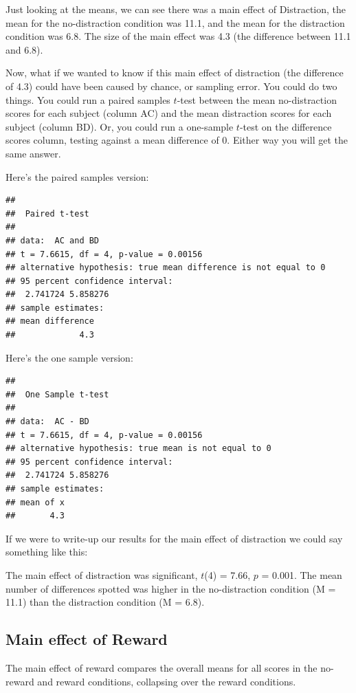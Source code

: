 \documentclass[
]{book}
\begin{document}
Just looking at the means, we can see there was a main effect of Distraction, the mean for the no-distraction condition was 11.1, and the mean for the distraction condition was 6.8. The size of the main effect was 4.3 (the difference between 11.1 and 6.8).

Now, what if we wanted to know if this main effect of distraction (the difference of 4.3) could have been caused by chance, or sampling error. You could do two things. You could run a paired samples \(t\)-test between the mean no-distraction scores for each subject (column AC) and the mean distraction scores for each subject (column BD). Or, you could run a one-sample \(t\)-test on the difference scores column, testing against a mean difference of 0. Either way you will get the same answer.

Here's the paired samples version:

\begin{verbatim}
## 
##  Paired t-test
## 
## data:  AC and BD
## t = 7.6615, df = 4, p-value = 0.00156
## alternative hypothesis: true mean difference is not equal to 0
## 95 percent confidence interval:
##  2.741724 5.858276
## sample estimates:
## mean difference 
##             4.3
\end{verbatim}

Here's the one sample version:

\begin{verbatim}
## 
##  One Sample t-test
## 
## data:  AC - BD
## t = 7.6615, df = 4, p-value = 0.00156
## alternative hypothesis: true mean is not equal to 0
## 95 percent confidence interval:
##  2.741724 5.858276
## sample estimates:
## mean of x 
##       4.3
\end{verbatim}

If we were to write-up our results for the main effect of distraction we could say something like this:

The main effect of distraction was significant, \(t\)(4) = 7.66, \(p\) = 0.001. The mean number of differences spotted was higher in the no-distraction condition (M = 11.1) than the distraction condition (M = 6.8).

\subsection{Main effect of Reward}\label{main-effect-of-reward}

The main effect of reward compares the overall means for all scores in the no-reward and reward conditions, collapsing over the reward conditions.
\end{document}
